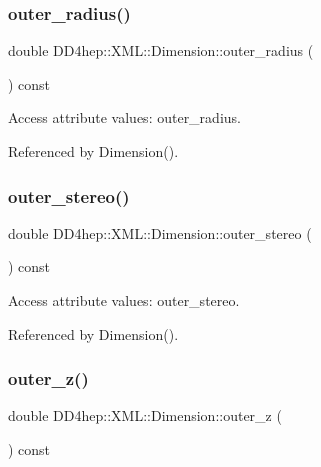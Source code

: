 \subsubsection{\texorpdfstring{outer\+\_\+radius()}{outer\_radius()}}
{\footnotesize\ttfamily double D\+D4hep\+::\+X\+M\+L\+::\+Dimension\+::outer\+\_\+radius (\begin{DoxyParamCaption}{ }\end{DoxyParamCaption}) const}



Access attribute values\+: outer\+\_\+radius. 



Referenced by Dimension().

\hypertarget{struct_d_d4hep_1_1_x_m_l_1_1_dimension_a6b339b15ea072e7d0b1897345432560a}{}\label{struct_d_d4hep_1_1_x_m_l_1_1_dimension_a6b339b15ea072e7d0b1897345432560a} 
\subsubsection{\texorpdfstring{outer\+\_\+stereo()}{outer\_stereo()}}
{\footnotesize\ttfamily double D\+D4hep\+::\+X\+M\+L\+::\+Dimension\+::outer\+\_\+stereo (\begin{DoxyParamCaption}{ }\end{DoxyParamCaption}) const}



Access attribute values\+: outer\+\_\+stereo. 



Referenced by Dimension().

\hypertarget{struct_d_d4hep_1_1_x_m_l_1_1_dimension_aab2a4a9f3d1f107dcd805d02a29f425c}{}\label{struct_d_d4hep_1_1_x_m_l_1_1_dimension_aab2a4a9f3d1f107dcd805d02a29f425c} 
\subsubsection{\texorpdfstring{outer\+\_\+z()}{outer\_z()}}
{\footnotesize\ttfamily double D\+D4hep\+::\+X\+M\+L\+::\+Dimension\+::outer\+\_\+z (\begin{DoxyParamCaption}{ }\end{DoxyParamCaption}) const}



